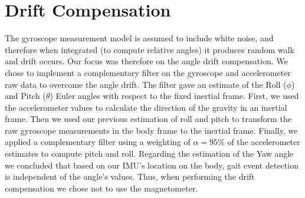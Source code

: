 \documentclass[10pt]{article}
\begin{document}
\section{Drift Compensation}
The gyroscope measurement model is assumed to include white noise, and therefore when integrated (to compute relative angles) it produces random walk and drift occurs. Our focus was therefore on the angle drift compensation.
We chose to implement a complementary filter on the gyroscope and accelerometer raw data to overcome the angle drift. The filter gave an estimate of the Roll ($\phi$) and Pitch ($\theta$) Euler angles with respect to the fixed inertial frame.
First, we used the accelerometer values to calculate the direction of the gravity in an inertial frame. Then we used our previous estimation of roll and pitch to transform the raw gyroscope measurements in the body frame to the inertial frame. Finally, we applied a complementary filter using a weighting of $\alpha=95\%$ of the accelerometer estimates to compute pitch and roll. 
Regarding the estimation of the Yaw angle we concluded that based on our IMU's location on the body, gait event detection is independent of the angle's values. Thus, when performing the drift compensation we chose not to use the magnetometer.
\end{document}
